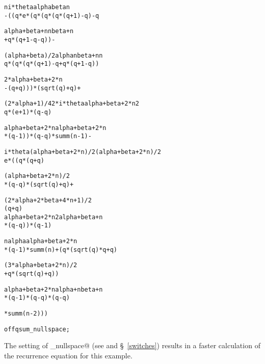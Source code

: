 {\footnotesize
\begin{alltt}
      n  i*theta   alpha   beta   n
 - ((q *e       *(q     *(q    *(q *(q + 1) - q) - q

               alpha + beta + n           n    beta + n
            + q                *(q + 1 - q  - q        )) - 

         (alpha + beta)/2   alpha   n                beta + n           n
        q                *(q     *(q *(q + 1) - q + q        *(q + 1 - q ))

                2*alpha + beta + 2*n
            - (q                     + q)))*(sqrt(q) + q) + 

      (2*alpha + 1)/4   2*i*theta        alpha + beta + 2*n    2
     q               *(e          + 1)*(q                   - q )

        alpha + beta + 2*n         alpha + beta + 2*n
     *(q                   - 1))*(q                   - q)*summ(n - 1) - 

     i*theta    (alpha + beta + 2*n)/2   (alpha + beta + 2*n)/2
    e       *((q                      *(q                       + q)

                  (alpha + beta + 2*n)/2
               *(q                       - q)*(sqrt(q) + q) + 

                 (2*alpha + 2*beta + 4*n + 1)/2
               (q                               + q)
\newpage
                  alpha + beta + 2*n    2     alpha + beta + n
               *(q                   - q ))*(q                 - 1)

                 n                  alpha               alpha + beta + 2*n
              *(q  - 1)*summ(n) + (q     *(sqrt(q)*q + q                  )

                     (3*alpha + beta + 2*n)/2
                  + q                        *(sqrt(q) + q))

                 alpha + beta + 2*n        alpha + n        beta + n
              *(q                   - 1)*(q          - q)*(q         - q)

              *summ(n - 2)))

\redprompt off qsum_nullspace;
\end{alltt}}

The setting of {\verb@qsum_nullspace@} 
(see \cite{Paule1} and \S~\ref{switches})
results in a faster
calculation of the recurrence equation for this example.



